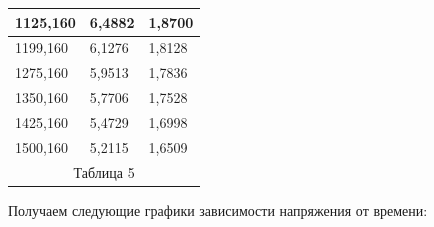 \documentclass[a4paper,12pt]{article} %
\begin{document}
\begin{enumerate}
\begin{table}[h!]
\begin{tabular}{lll}
		\multicolumn{1}{|l|}{1125,160} & \multicolumn{1}{l|}{6,4882}  & \multicolumn{1}{l|}{1,8700}   \\ \hline
		\multicolumn{1}{|l|}{1199,160} & \multicolumn{1}{l|}{6,1276}  & \multicolumn{1}{l|}{1,8128}   \\ \hline
		\multicolumn{1}{|l|}{1275,160} & \multicolumn{1}{l|}{5,9513}  & \multicolumn{1}{l|}{1,7836}   \\ \hline
		\multicolumn{1}{|l|}{1350,160} & \multicolumn{1}{l|}{5,7706}  & \multicolumn{1}{l|}{1,7528}   \\ \hline
		\multicolumn{1}{|l|}{1425,160} & \multicolumn{1}{l|}{5,4729}  & \multicolumn{1}{l|}{1,6998}   \\ \hline
		\multicolumn{1}{|l|}{1500,160} & \multicolumn{1}{l|}{5,2115}  & \multicolumn{1}{l|}{1,6509}   \\ \hline
		\multicolumn{3}{c}{Таблица 5}                                                                
	\end{tabular}
\end{table}

\newpage

Получаем следующие графики зависимости напряжения от времени:


\end{enumerate}
\end{document}
